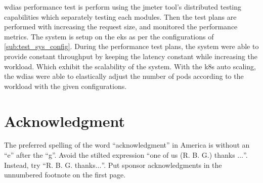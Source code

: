 \documentclass[conference]{IEEEtran}
\begin{document}
\acrshort{wdias} performance test is perform using the \acrshort{jmeter} tool's distributed testing capabilities which separately testing each modules. Then the test plans are performed with increasing the request size, and monitored the performance metrics. The system is setup on the \acrfull{eks} as per the configurations of \ref{sub:test_sys_config}.
During the performance test plans, the system were able to provide constant throughput by keeping the latency constant while increasing the workload. Which exhibit the scalability of the system.
With the \acrshort{k8s} auto scaling, the \acrshort{wdias} were able to elastically adjust the number of pods according to the workload with the given configurations.

\section*{Acknowledgment}

The preferred spelling of the word ``acknowledgment'' in America is without 
an ``e'' after the ``g''. Avoid the stilted expression ``one of us (R. B. 
G.) thanks $\ldots$''. Instead, try ``R. B. G. thanks$\ldots$''. Put sponsor 
acknowledgments in the unnumbered footnote on the first page.


\graphicspath{ {./images/} }



\end{document}
